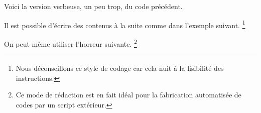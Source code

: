\documentclass[10pt, a4paper]{article}
\begin{document}


Voici la version verbeuse, un peu trop, du code précédent.



Il est possible d'écrire des contenus à la suite comme dans l'exemple suivant.
\footnote{
    Nous déconseillons ce style de codage car cela nuit à la lisibilité des instructions.
}



On peut même utiliser l'horreur suivante.
\footnote{
    Ce mode de rédaction est en fait idéal pour la fabrication automatisée de codes par un script extérieur.
}

\end{document}
